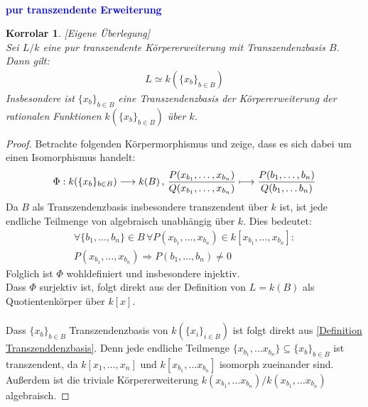 \documentclass[10pt,a4paper]{report}
\newcounter{Aussage}[chapter]
\newtheorem{korrolar}[Aussage]{Korrolar}
\newcommand{\function}[5]{\nolinebreak{#1:#2 \longrightarrow #3 \, , \, #4 \longmapsto #5}}
\begin{document}
\ \\
\textcolor{blue}{\textbf{pur transzendente Erweiterung} }
\begin{korrolar}\label{pur transzendente Erweiterung} \textit{[Eigene Überlegung]}\\
Sei $L/k$ eine pur transzendente Körpererweiterung mit Transzendenzbasis $B$. Dann gilt:
\begin{gather*}
L \simeq k(\lbrace x_b \rbrace_{b \in B})
\end{gather*}
Insbesondere ist $\lbrace x_b \rbrace_{b \in B}$ eine Transzendenzbasis der Körpererweiterung der rationalen Funktionen $k(\lbrace x_b \rbrace_{b \in B})$ über $k$.
\end{korrolar}
\begin{proof} Betrachte folgenden Körpermorphismus und zeige, dass es sich dabei um einen Isomorphismus handelt:
\begin{gather*}
\function{\Phi}{k(\lbrace x_b \rbrace_{b \in B})}{k(B)}{\frac{P( x_{b_1} , \dots , x_{b_n} )}{Q( x_{b_1} , \dots , x_{b_n} )}}{\frac{P( b_1 , \dots , b_n )}{Q( b_1 , \dots b_n )}}
\end{gather*}
Da $B$ als Transzendenzbasis insbesondere transzendent über $k$ ist, ist jede endliche Teilmenge von algebraisch unabhängig über $k$. Dies bedeutet:
\begin{gather*}
\forall \lbrace b_1, \dots , b_n \rbrace \in B \, \forall P( x_{b_1} , \dots , x_{b_n} ) \in k[x_{b_1} , \dots , x_{b_n}] :\\
P( x_{b_1} , \dots , x_{b_n} ) \Rightarrow P(b_1, \dots ,b_n) \neq 0
\end{gather*}
Folglich ist $\Phi$ wohldefiniert und insbesondere injektiv.\\
Dass $\Phi$ surjektiv ist, folgt direkt aus der Definition von $L = k(B)$ als Quotientenkörper über $k[x]$.\\
\ \\
Dass $\lbrace x_b \rbrace_{b \in B}$ Transzendenzbasis von $k(\lbrace x_i \rbrace_{i \in B})$ ist folgt direkt aus \cref{Definition Transzenddenzbasis}. Denn jede endliche Teilmenge $\lbrace x_{b_1}, \dots x_{b_n} \rbrace  \subseteq  \lbrace x_b \rbrace_{b \in B}$ ist transzendent, da $k[x_1,\dots,x_n]$ und $k[x_{b_1}, \dots x_{b_n}]$ isomorph zueinander sind. Außerdem ist die triviale Körpererweiterung $k(x_{b_1}, \dots x_{b_n})/k(x_{b_1}, \dots x_{b_n})$ algebraisch.
\end{proof}
\end{document}
